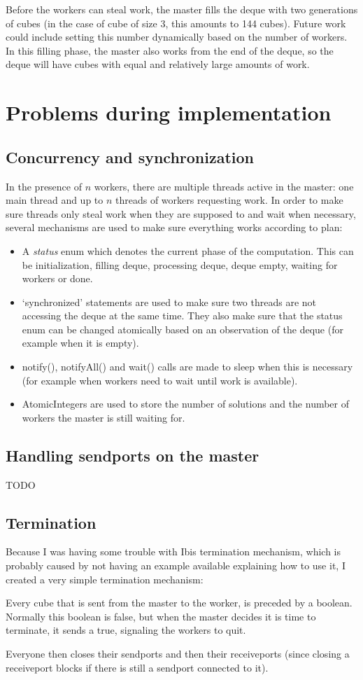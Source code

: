 \documentclass[11pt,a4paper]{article}
\begin{document}
Before the workers can steal work, the master fills the deque with two generations of cubes (in the case of cube of size 3, this amounts to 144 cubes). Future work could include setting this number dynamically based on the number of workers. In this filling phase, the master also works from the end of the deque, so the deque will have cubes with equal and relatively large amounts of work.

\section{Problems during implementation}

\subsection{Concurrency and synchronization}
In the presence of $n$ workers, there are multiple threads active in the master: one main thread and up to $n$ threads of workers requesting work. In order to make sure threads only steal work when they are supposed to and wait when necessary, several mechanisms are used to make sure everything works according to plan:
\begin{itemize}
\item A \emph{status} enum which denotes the current phase of the computation. This can be initialization, filling deque, processing deque, deque empty, waiting for workers or done.
\item `synchronized' statements are used to make sure two threads are not accessing the deque at the same time. They also make sure that the status enum can be changed atomically based on an observation of the deque (for example when it is empty).
\item notify(), notifyAll() and wait() calls are made to sleep when this is necessary (for example when workers need to wait until work is available).
\item AtomicIntegers are used to store the number of solutions and the number of workers the master is still waiting for.
\end{itemize}

\subsection{Handling sendports on the master}
TODO

\subsection{Termination}
Because I was having some trouble with Ibis termination mechanism, which is probably caused by not having an example available explaining how to use it, I created a very simple termination mechanism:

Every cube that is sent from the master to the worker, is preceded by a boolean. Normally this boolean is false, but when the master decides it is time to terminate, it sends a true, signaling the workers to quit.

Everyone then closes their sendports and then their receiveports (since closing a receiveport blocks if there is still a sendport connected to it).
\end{document}
